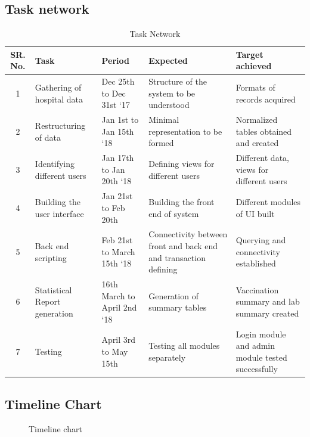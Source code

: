 \documentclass[oneside,a4paper,12pt]{book}
\begin{document}
\subsection{Task network}  
\begin{table}[!htbp]
\begin{center}
\def\arraystretch{1.5}
\begin{tabularx}{\textwidth}{| c | X | X | X | X |}
\hline
\multirow{1}{*}{SR. No.} & \multirow{1}{*}{Task}	& \multirow{1}{*}{Period} & \multirow{1}{*}{Expected } & \multirow{1}{*}{Target achieved}  \\ \hline
1& Gathering of hospital data &	Dec 25th to Dec 31st ‘17	& Structure of the system to be understood &	Formats of records acquired \\ \hline
2& Restructuring of data& Jan 1st to Jan 15th ‘18 &	Minimal representation to be formed &	Normalized tables obtained and created \\ \hline
3& Identifying different users &	Jan 17th to Jan 20th ‘18 &	Defining views for different users	&	Different data, views for different users \\ \hline
4 &	Building the user interface &	Jan 21st to Feb 20th  &	Building the front end of system &	Different modules of UI built \\ \hline
5 &	Back end scripting &	Feb 21st to March 15th ‘18 &	Connectivity between front and back end and transaction defining &	Querying and connectivity established \\ \hline
6 &	Statistical Report generation &	16th March to April 2nd ‘18 &	Generation of summary tables	& Vaccination summary and lab summary created \\ \hline
7 &	Testing	& April 3rd to May 15th & 	Testing all modules separately &	Login module and admin module tested successfully \\ \hline

\end{tabularx}
\end{center}
\caption{Task Network}
\label{tab:risk}
\end{table}
\newpage
\subsection{Timeline Chart}  
\begin{center}
	\begin{figure}[!htbp]
		\centering
	  \caption{Timeline chart}
	  \label{fig:timeline}
	\end{figure}
\end{center}
\end{document}
